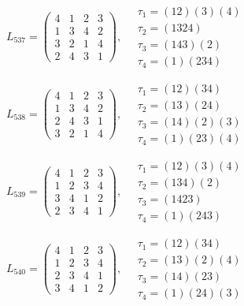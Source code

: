 $L_{537} = \begin{pmatrix} 4 & 1 & 2 & 3 \\ 1 & 3 & 4 & 2 \\ 3 & 2 & 1 & 4 \\ 2 & 4 & 3 & 1 \end{pmatrix}, \quad \begin{matrix} \tau_{1} = (1 2)(3)(4) \\ \tau_{2} = (1 3 2 4) \\ \tau_{3} = (1 4 3)(2) \\ \tau_{4} = (1)(2 3 4) \end{matrix}$

$L_{538} = \begin{pmatrix} 4 & 1 & 2 & 3 \\ 1 & 3 & 4 & 2 \\ 2 & 4 & 3 & 1 \\ 3 & 2 & 1 & 4 \end{pmatrix}, \quad \begin{matrix} \tau_{1} = (1 2)(3 4) \\ \tau_{2} = (1 3)(2 4) \\ \tau_{3} = (1 4)(2)(3) \\ \tau_{4} = (1)(2 3)(4) \end{matrix}$

$L_{539} = \begin{pmatrix} 4 & 1 & 2 & 3 \\ 1 & 2 & 3 & 4 \\ 3 & 4 & 1 & 2 \\ 2 & 3 & 4 & 1 \end{pmatrix}, \quad \begin{matrix} \tau_{1} = (1 2)(3)(4) \\ \tau_{2} = (1 3 4)(2) \\ \tau_{3} = (1 4 2 3) \\ \tau_{4} = (1)(2 4 3) \end{matrix}$

$L_{540} = \begin{pmatrix} 4 & 1 & 2 & 3 \\ 1 & 2 & 3 & 4 \\ 2 & 3 & 4 & 1 \\ 3 & 4 & 1 & 2 \end{pmatrix}, \quad \begin{matrix} \tau_{1} = (1 2)(3 4) \\ \tau_{2} = (1 3)(2)(4) \\ \tau_{3} = (1 4)(2 3) \\ \tau_{4} = (1)(2 4)(3) \end{matrix}$

